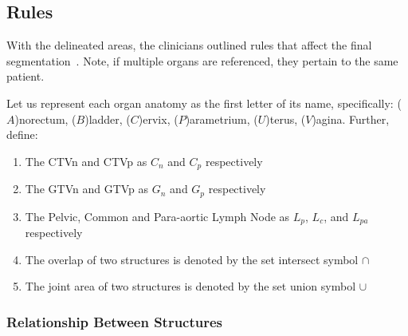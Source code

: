 \documentclass[11pt,twoside]{report}
\begin{document}
\subsection{Rules}\label{sec:rules}

With the delineated areas, the clinicians outlined rules that affect the final segmentation~\cite{AMLART-data}. Note, if multiple organs are referenced, they pertain to the same patient.

Let us represent each organ anatomy as the first letter of its name, specifically: ($A$)norectum, ($B$)ladder, ($C$)ervix, ($P$)arametrium, ($U$)terus, ($V$)agina. Further, define:

\begin{enumerate}
  \item The CTVn and CTVp as $C_n$ and $C_p$ respectively
  \item The GTVn and GTVp as $G_n$ and $G_p$ respectively
  \item The Pelvic, Common and Para-aortic Lymph Node as $L_p$, $L_c$, and $L_{pa}$ respectively  
  \item The overlap of two structures is denoted by the set intersect symbol $\cap$
  \item The joint area of two structures is denoted by the set union symbol $\cup$
\end{enumerate}

\subsubsection{Relationship Between Structures}
\end{document}
